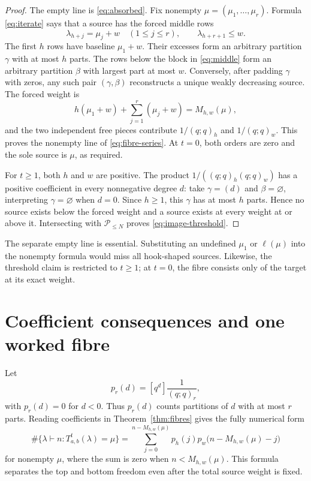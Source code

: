 \documentclass[a4paper,10pt]{amsart}
\theoremstyle{remark}
\newcommand{\Part}{\mathcal P}
\newcommand{\elln}{\ell}
\newcommand{\emptypar}{\varnothing}
\newcommand{\qfac}[1]{(q;q)_{#1}}
\begin{document}
\begin{proof}
The empty line is \eqref{eq:absorbed}.  Fix nonempty
$\mu=(\mu_1,\ldots,\mu_r)$.  Formula \eqref{eq:iterate} says that a source
has the forced middle rows
\begin{equation}\label{eq:middle}
 \lambda_{h+j}=\mu_j+w\quad(1\leq j\leq r),
 \qquad \lambda_{h+r+1}\leq w.
\end{equation}
The first $h$ rows have baseline $\mu_1+w$.  Their excesses form an arbitrary
partition $\gamma$ with at most $h$ parts.  The rows below the block in
\eqref{eq:middle} form an arbitrary partition $\beta$ with largest part at
most $w$.  Conversely, after padding $\gamma$ with zeros, any such pair
$(\gamma,\beta)$ reconstructs a unique weakly decreasing source.  The forced
weight is
\[
 h(\mu_1+w)+\sum_{j=1}^r(\mu_j+w)=M_{h,w}(\mu),
\]
and the two independent free pieces contribute $1/\qfac h$ and
$1/\qfac w$.  This proves the nonempty line of
\eqref{eq:fibre-series}.  At $t=0$, both orders are zero and the sole source
is $\mu$, as required.

For $t\geq1$, both $h$ and $w$ are positive.  The product
$1/(\qfac h\qfac w)$ has a positive coefficient in every nonnegative degree
$d$: take $\gamma=(d)$ and $\beta=\emptypar$, interpreting $\gamma=\emptypar$
when $d=0$.  Since $h\geq1$, this $\gamma$ has at most $h$ parts.  Hence no source
exists below the forced weight and a source exists at every weight at or
above it.  Intersecting with $\Part_{\leq N}$ proves
\eqref{eq:image-threshold}.
\end{proof}

The separate empty line is essential.  Substituting an undefined
$\mu_1$ or $\elln(\mu)$ into the nonempty formula would miss all hook-shaped
sources.  Likewise, the threshold claim is restricted to $t\geq1$; at
$t=0$, the fibre consists only of the target at its exact weight.

\section{Coefficient consequences and one worked fibre}\label{sec:coefficients}

Let
\[
 p_r(d)=[q^d]\frac1{\qfac r},
\]
with $p_r(d)=0$ for $d<0$.  Thus $p_r(d)$ counts partitions of $d$ with at
most $r$ parts.  Reading coefficients in Theorem~\ref{thm:fibres} gives the
fully numerical form
\begin{equation}\label{eq:coefficient-fibre}
 \#\{\lambda\vdash n:T_{a,b}^{t}(\lambda)=\mu\}
 =\sum_{j=0}^{n-M_{h,w}(\mu)}p_h(j)
    p_w\bigl(n-M_{h,w}(\mu)-j\bigr)
\end{equation}
for nonempty $\mu$, where the sum is zero when $n<M_{h,w}(\mu)$.  This
formula separates the top and bottom freedom even after the total source
weight is fixed.
\end{document}
